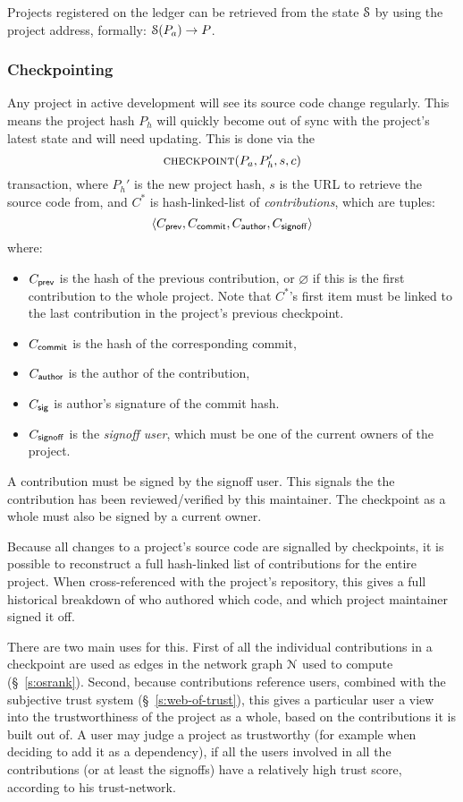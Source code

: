 Projects registered on the ledger can be retrieved from the state $\mathcal{S}$ by
using the project address, formally: $\mathcal{S}(P_a) \to P$.

\subsubsection{Checkpointing} Any project in active development will see its
source code change regularly. This means the project hash $P_h$ will quickly
become out of sync with the project's latest state and will need updating. This
is done via the
\[
    \text{\normalfont\scshape checkpoint}\small{\lparen P_a, P_h', s, c\rparen}
\]
transaction, where $P_h'$ is the new project hash, $s$ is the URL to
retrieve the source code from, and $C^*$ is hash-linked-list of
\emph{contributions}, which are tuples:
\[
   \langle C_{\mathsf{prev}}, C_{\mathsf{commit}}, C_{\mathsf{author}}, C_{\mathsf{signoff}}\rangle
\]
where:
\begin{itemize}
\item $C_{\mathsf{prev}}$ is the hash of the previous contribution, or
  $\varnothing$ if this is the first contribution to the whole
  project. Note that $C^*$'s first item must be linked to the last
  contribution in the project's previous checkpoint.
\item $C_{\mathsf{commit}}$ is the hash of the corresponding commit,
\item $C_{\mathsf{author}}$ is the author of the contribution,
\item $C_{\mathsf{sig}}$ is author's signature of the commit hash. 
\item $C_{\mathsf{signoff}}$ is the \emph{signoff user}, which must be
  one of the current owners of the project.
\end{itemize}
A contribution must be signed by the signoff user. This signals the
the contribution has been reviewed/verified by this maintainer. The
checkpoint as a whole must also be signed by a current owner.

Because all changes to a project's source code are signalled by
checkpoints, it is possible to reconstruct a full hash-linked list of
contributions for the entire project. When cross-referenced with the
project's repository, this gives a full historical breakdown of who
authored which code, and which project maintainer signed it off.

There are two main uses for this. First of all the individual
contributions in a checkpoint are used as edges in the network graph
$\mathcal{N}$ used to compute \osrank{} (\S~\ref{s:osrank}).
Second, because contributions reference users, combined with the
subjective trust system (\S~\ref{s:web-of-trust}), this gives a
particular user a view into the trustworthiness of the project as a
whole, based on the contributions it is built out of. A user may judge
a project as trustworthy (for example when deciding to add it as a
dependency), if all the users involved in all the contributions (or at
least the signoffs) have a relatively high trust score, according to
his trust-network.

